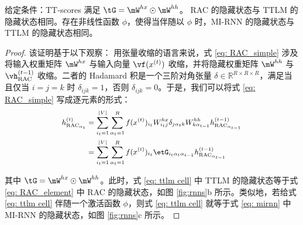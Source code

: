 









\begin{claim}
\label{cm: G and RACs} 给定条件：TT-scores 满足 $\tG = \mW^{hx} \odot \mW^{hh}$。
RAC 的隐藏状态与 TTLM 的隐藏状态相同。存在非线性函数 $\phi$，使得当伴随以 $\phi$ 时，MI-RNN 的隐藏状态与 TTLM 的隐藏状态相同。
\end{claim}



\begin{proof} 该证明基于以下观察：
%
用张量收缩的语言来说，式 \ref{eq: RAC_simple} 涉及将输入权重矩阵 $\mW^{hx}$ 与输入向量 $\vf (x^{(t)})$ 收缩，并将隐藏权重矩阵 $\mW^{hh}$ 与 $\vh^{(t-1)}_\textrm{RAC}$ 收缩。二者的 Hadamard 积是一个三阶对角张量 $\delta \in \mathbb{R}^{R \times R \times R}$，满足当且仅当 $i = j = k$ 时 $\delta_{ijk} = 1$，否则 $\delta_{ijk} = 0$。于是，我们可以将式 \ref{eq: RAC_simple} 写成逐元素的形式：
%
\begin{equation} \small
\begin{split}
    \label{eq: RAC_element}
    h^{(t)}_{\textrm{RAC}_{\alpha_t}}
    & = \sum_{{i_t = 1}}^{|V|} \sum_{{\alpha_t = 1}}^{R} f(x^{(t)})_{i_t}W^{hx}_{i_tj}\mathbf{\delta}_{j\alpha_{t}k}W^{hh}_{k\alpha_{t-1}} h^{(t-1)}_{\textrm{RAC}_{\alpha_{t-1}}} \\
    & = \sum_{{i_t = 1}}^{|V|} \sum_{{\alpha_t = 1}}^{R} f(x^{(t)})_{i_t}\etG_{i_t\alpha_{t}\alpha_{t-1}} h^{(t-1)}_{\textrm{RAC}_{\alpha_{t-1}}} \\
\end{split}
\end{equation}


其中 $\tG = \mW^{hx} \odot \mW^{hh}$。此时，式 \ref{eq: ttlm cell} 中 TTLM 的隐藏状态等于式 \ref{eq: RAC_element} 中 RAC 的隐藏状态，如图 \ref{fig:rnns}b 所示。类似地，若给式 \ref{eq: ttlm cell} 伴随一个激活函数 $\phi$，则式 \ref{eq: ttlm cell} 就等于式 \ref{eq: mirnn} 中 MI-RNN 的隐藏状态，如图 \ref{fig:rnns}c 所示。

\end{proof}

